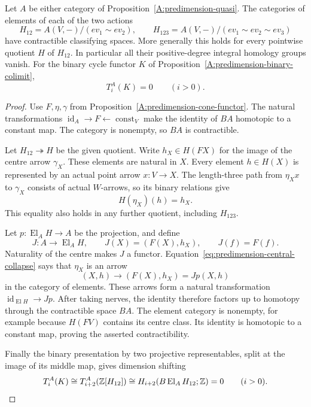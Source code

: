 \begin{theorem}
\label{A:predimension-cone-contracts}
Let $A$ be either category of
Proposition~\ref{A:predimension-quasi}. The categories of elements
of each of the two actions
\[
 H_{12}=A(V,-)/(ev_1\sim ev_2),
 \qquad
 H_{123}=A(V,-)/(ev_1\sim ev_2\sim ev_3)
\]
have contractible classifying spaces. More generally this holds for
every pointwise quotient $H$ of $H_{12}$. In particular all their
positive-degree integral homology groups vanish. For the binary
cycle functor $K$ of Proposition~\ref{A:predimension-binary-colimit},
\[
 T_i^A(K)=0\qquad(i>0).
\]
\end{theorem}
\begin{proof}
Use $F,\eta,\gamma$ from
Proposition~\ref{A:predimension-cone-functor}. The natural
transformations
$\operatorname{id}_A\to F\leftarrow\operatorname{const}_V$
make the identity of $BA$ homotopic to a constant map. The category
is nonempty, so $BA$ is contractible.

Let $H_{12}\twoheadrightarrow H$ be the given quotient. Write
$h_X\in H(FX)$ for the image of the centre arrow $\gamma_X$.
These elements are natural in $X$. Every element $h\in H(X)$ is
represented by an actual point arrow $x:V\to X$. The length-three
path from $\eta_Xx$ to $\gamma_X$ consists of actual $W$-arrows,
so its binary relations give
\[
 H(\eta_X)(h)=h_X.
 \tag{CC}\label{eq:predimension-central-collapse}
\]
This equality also holds in any further quotient, including
$H_{123}$.

Let $p:\operatorname{El}_A H\to A$ be the projection, and define
\[
 J:A\longrightarrow\operatorname{El}_A H,
 \qquad J(X)=(F(X),h_X),\qquad J(f)=F(f).
\]
Naturality of the centre makes $J$ a functor.
Equation~\eqref{eq:predimension-central-collapse} says that
$\eta_X$ is an arrow
\[
 (X,h)\longrightarrow (F(X),h_X)=Jp(X,h)
\]
in the category of elements. These arrows form a natural
transformation $\operatorname{id}_{\operatorname{El}H}\to Jp$.
After taking nerves, the identity therefore factors up to homotopy
through the contractible space $BA$. The element category is
nonempty, for example because $H(FV)$ contains its centre class.
Its identity is homotopic to a constant map, proving the asserted
contractibility.

Finally the binary presentation by two projective representables,
split at the image of its middle map, gives dimension shifting
\[
 T_i^A(K)\cong T_{i+2}^A(\mathbb Z[H_{12}])
       \cong H_{i+2}(B\operatorname{El}_A H_{12};\mathbb Z)=0
 \qquad(i>0).
\]
\end{proof}

